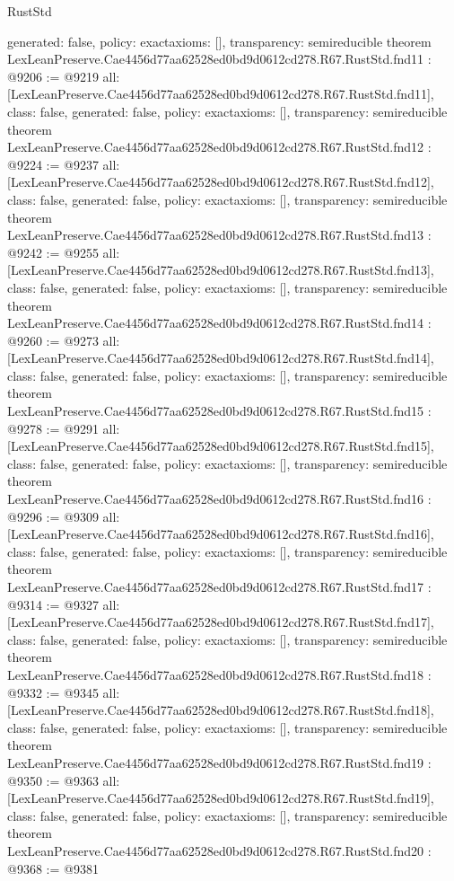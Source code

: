\begin{lexlean}{RustStd}
\begin{coremodule}
{  generated: false,
  policy: exact{axioms: []},
  transparency: semireducible
}
theorem LexLeanPreserve.Cae4456d77aa62528ed0bd9d0612cd278.R67.RustStd.fnd11 : @9206 := @9219 {
  all: [LexLeanPreserve.Cae4456d77aa62528ed0bd9d0612cd278.R67.RustStd.fnd11],
  class: false,
  generated: false,
  policy: exact{axioms: []},
  transparency: semireducible
}
theorem LexLeanPreserve.Cae4456d77aa62528ed0bd9d0612cd278.R67.RustStd.fnd12 : @9224 := @9237 {
  all: [LexLeanPreserve.Cae4456d77aa62528ed0bd9d0612cd278.R67.RustStd.fnd12],
  class: false,
  generated: false,
  policy: exact{axioms: []},
  transparency: semireducible
}
theorem LexLeanPreserve.Cae4456d77aa62528ed0bd9d0612cd278.R67.RustStd.fnd13 : @9242 := @9255 {
  all: [LexLeanPreserve.Cae4456d77aa62528ed0bd9d0612cd278.R67.RustStd.fnd13],
  class: false,
  generated: false,
  policy: exact{axioms: []},
  transparency: semireducible
}
theorem LexLeanPreserve.Cae4456d77aa62528ed0bd9d0612cd278.R67.RustStd.fnd14 : @9260 := @9273 {
  all: [LexLeanPreserve.Cae4456d77aa62528ed0bd9d0612cd278.R67.RustStd.fnd14],
  class: false,
  generated: false,
  policy: exact{axioms: []},
  transparency: semireducible
}
theorem LexLeanPreserve.Cae4456d77aa62528ed0bd9d0612cd278.R67.RustStd.fnd15 : @9278 := @9291 {
  all: [LexLeanPreserve.Cae4456d77aa62528ed0bd9d0612cd278.R67.RustStd.fnd15],
  class: false,
  generated: false,
  policy: exact{axioms: []},
  transparency: semireducible
}
theorem LexLeanPreserve.Cae4456d77aa62528ed0bd9d0612cd278.R67.RustStd.fnd16 : @9296 := @9309 {
  all: [LexLeanPreserve.Cae4456d77aa62528ed0bd9d0612cd278.R67.RustStd.fnd16],
  class: false,
  generated: false,
  policy: exact{axioms: []},
  transparency: semireducible
}
theorem LexLeanPreserve.Cae4456d77aa62528ed0bd9d0612cd278.R67.RustStd.fnd17 : @9314 := @9327 {
  all: [LexLeanPreserve.Cae4456d77aa62528ed0bd9d0612cd278.R67.RustStd.fnd17],
  class: false,
  generated: false,
  policy: exact{axioms: []},
  transparency: semireducible
}
theorem LexLeanPreserve.Cae4456d77aa62528ed0bd9d0612cd278.R67.RustStd.fnd18 : @9332 := @9345 {
  all: [LexLeanPreserve.Cae4456d77aa62528ed0bd9d0612cd278.R67.RustStd.fnd18],
  class: false,
  generated: false,
  policy: exact{axioms: []},
  transparency: semireducible
}
theorem LexLeanPreserve.Cae4456d77aa62528ed0bd9d0612cd278.R67.RustStd.fnd19 : @9350 := @9363 {
  all: [LexLeanPreserve.Cae4456d77aa62528ed0bd9d0612cd278.R67.RustStd.fnd19],
  class: false,
  generated: false,
  policy: exact{axioms: []},
  transparency: semireducible
}
theorem LexLeanPreserve.Cae4456d77aa62528ed0bd9d0612cd278.R67.RustStd.fnd20 : @9368 := @9381 {
}
\end{coremodule}
\end{lexlean}
